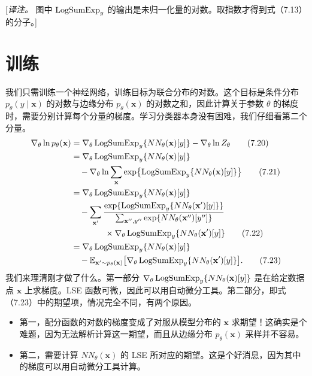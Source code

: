 [\emph{译注。} 图中 $\operatorname{LogSumExp}_y$ 的输出是未归一化量的对数。取指数才得到式（7.13）的分子。]

\section{训练}
我们只需训练一个神经网络，训练目标为联合分布的对数。这个目标是条件分布 $p_\theta(y\mid\mathbf{x})$ 的对数与边缘分布 $p_\theta(\mathbf{x})$ 的对数之和，因此计算关于参数 $\theta$ 的梯度时，需要分别计算每个分量的梯度。学习分类器本身没有困难，我们仔细看第二个分量。
\begin{align}
\nabla_\theta\ln p_\theta(\mathbf{x})
 &=\nabla_\theta\operatorname{LogSumExp}_y\{NN_\theta(\mathbf{x})[y]\}-\nabla_\theta\ln Z_\theta
     \tag{7.20}\label{eq:07-20}\\
 &=\nabla_\theta\operatorname{LogSumExp}_y\{NN_\theta(\mathbf{x})[y]\}\notag\\
 &\quad-\nabla_\theta\ln\sum_{\mathbf{x}}
           \exp\bigl\{\operatorname{LogSumExp}_y\{NN_\theta(\mathbf{x})[y]\}\bigr\}
     \tag{7.21}\label{eq:07-21}\\
 &=\nabla_\theta\operatorname{LogSumExp}_y\{NN_\theta(\mathbf{x})[y]\}\notag\\
 &\quad-\sum_{\mathbf{x}'}
   \frac{\exp\{\operatorname{LogSumExp}_y\{NN_\theta(\mathbf{x}')[y]\}\}}
        {\sum_{\mathbf{x}'',y''}\exp\{NN_\theta(\mathbf{x}'')[y'']\}}
        \notag\\
 &\qquad\qquad{}\times\nabla_\theta\operatorname{LogSumExp}_y\{NN_\theta(\mathbf{x}')[y]\}
     \tag{7.22}\label{eq:07-22}\\
 &=\nabla_\theta\operatorname{LogSumExp}_y\{NN_\theta(\mathbf{x})[y]\}\notag\\
 &\quad-\mathbb E_{\mathbf{x}'\sim p_\theta(\mathbf{x})}
          \bigl[\nabla_\theta\operatorname{LogSumExp}_y\{NN_\theta(\mathbf{x}')[y]\}\bigr].
     \tag{7.23}\label{eq:07-23}
\end{align}
我们来理清刚才做了什么。第一部分 $\nabla_\theta\operatorname{LogSumExp}_y\{NN_\theta(\mathbf{x})[y]\}$ 是在给定数据点 $\mathbf{x}$ 上求梯度。LSE 函数可微，因此可以用自动微分工具。第二部分，即式（7.23）中的期望项，情况完全不同，有两个原因。
\begin{itemize}
\item 第一，配分函数的对数的梯度变成了对服从模型分布的 $\mathbf{x}$ 求期望！这确实是个难题，因为无法解析计算这一期望，而且从边缘分布 $p_\theta(\mathbf{x})$ 采样并不容易。
\item 第二，需要计算 $NN_\theta(\mathbf{x})$ 的 LSE 所对应的期望。这是个好消息，因为其中的梯度可以用自动微分工具计算。
\end{itemize}


